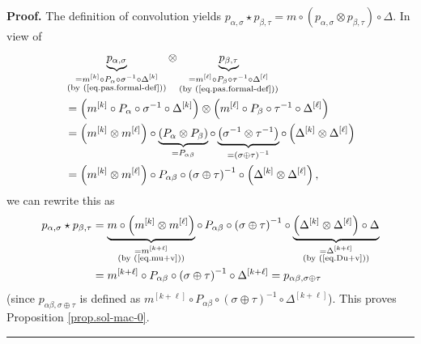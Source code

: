 \documentclass[numbers=enddot,12pt,final,onecolumn,notitlepage]{scrartcl}%
\theoremstyle{definition}
\newenvironment{proof}[1][Proof]{\noindent\textbf{#1.} }{\ \rule{0.5em}{0.5em}}
\begin{document}
\begin{proof}
The definition of convolution yields $p_{\alpha,\sigma}\star p_{\beta,\tau
}=m\circ\left(  p_{\alpha,\sigma}\otimes p_{\beta,\tau}\right)  \circ\Delta$.
In view of%
\begin{align*}
&  \underbrace{p_{\alpha,\sigma}}_{\substack{=m^{\left[  k\right]  }\circ
P_{\alpha}\circ\sigma^{-1}\circ\Delta^{\left[  k\right]  }\\\text{(by
(\ref{eq.pas.formal-def}))}}}\otimes\underbrace{p_{\beta,\tau}}%
_{\substack{=m^{\left[  \ell\right]  }\circ P_{\beta}\circ\tau^{-1}\circ
\Delta^{\left[  \ell\right]  }\\\text{(by (\ref{eq.pas.formal-def}))}}}\\
&  =\left(  m^{\left[  k\right]  }\circ P_{\alpha}\circ\sigma^{-1}\circ
\Delta^{\left[  k\right]  }\right)  \otimes\left(  m^{\left[  \ell\right]
}\circ P_{\beta}\circ\tau^{-1}\circ\Delta^{\left[  \ell\right]  }\right) \\
&  =\left(  m^{\left[  k\right]  }\otimes m^{\left[  \ell\right]  }\right)
\circ\underbrace{\left(  P_{\alpha}\otimes P_{\beta}\right)  }_{=P_{\alpha
\beta}}\circ\underbrace{\left(  \sigma^{-1}\otimes\tau^{-1}\right)
}_{=\left(  \sigma\oplus\tau\right)  ^{-1}}\circ\left(  \Delta^{\left[
k\right]  }\otimes\Delta^{\left[  \ell\right]  }\right) \\
&  =\left(  m^{\left[  k\right]  }\otimes m^{\left[  \ell\right]  }\right)
\circ P_{\alpha\beta}\circ\left(  \sigma\oplus\tau\right)  ^{-1}\circ\left(
\Delta^{\left[  k\right]  }\otimes\Delta^{\left[  \ell\right]  }\right)  ,
\end{align*}
we can rewrite this as
\begin{align*}
p_{\alpha,\sigma}\star p_{\beta,\tau}  &  =\underbrace{m\circ\left(
m^{\left[  k\right]  }\otimes m^{\left[  \ell\right]  }\right)  }%
_{\substack{=m^{\left[  k+\ell\right]  }\\\text{(by (\ref{eq.mu+v}))}}%
}\circ\,P_{\alpha\beta}\circ\left(  \sigma\oplus\tau\right)  ^{-1}%
\circ\underbrace{\left(  \Delta^{\left[  k\right]  }\otimes\Delta^{\left[
\ell\right]  }\right)  \circ\Delta}_{\substack{=\Delta^{\left[  k+\ell\right]
}\\\text{(by (\ref{eq.Du+v}))}}}\\
&  =m^{\left[  k+\ell\right]  }\circ P_{\alpha\beta}\circ\left(  \sigma
\oplus\tau\right)  ^{-1}\circ\Delta^{\left[  k+\ell\right]  }=p_{\alpha
\beta,\sigma\oplus\tau}%
\end{align*}
(since $p_{\alpha\beta,\sigma\oplus\tau}$ is defined as $m^{\left[
k+\ell\right]  }\circ P_{\alpha\beta}\circ\left(  \sigma\oplus\tau\right)
^{-1}\circ\Delta^{\left[  k+\ell\right]  }$). This proves Proposition
\ref{prop.sol-mac-0}.
\end{proof}
\end{document}
